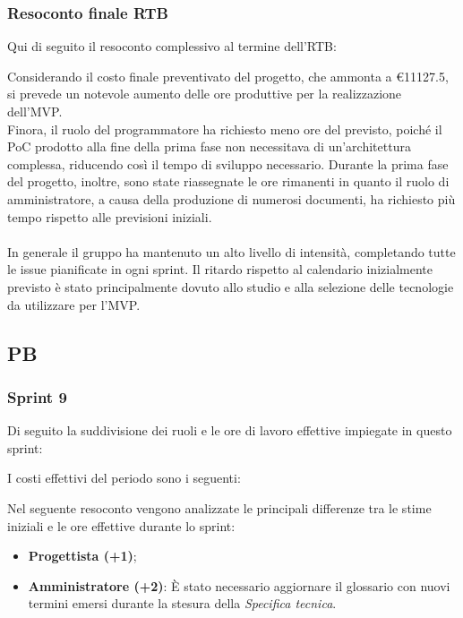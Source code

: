 \subsubsection{Resoconto finale RTB}
Qui di seguito il resoconto complessivo al termine dell'RTB:



Considerando il costo finale preventivato del progetto, che ammonta a \euro{11127.5}, si prevede un notevole aumento delle ore produttive per la realizzazione dell'MVP.\\
Finora, il ruolo del programmatore ha richiesto meno ore del previsto, poiché il PoC prodotto alla fine della prima fase non necessitava di un'architettura complessa, riducendo così il tempo di sviluppo necessario. 
Durante la prima fase del progetto, inoltre, sono state riassegnate le ore rimanenti in quanto il ruolo di amministratore, a causa della produzione di numerosi documenti, ha richiesto più tempo rispetto alle previsioni iniziali.\\\\
In generale il gruppo ha mantenuto un alto livello di intensità, completando tutte le issue pianificate in ogni sprint. 
Il ritardo rispetto al calendario inizialmente previsto è stato principalmente dovuto allo studio e alla selezione delle tecnologie da utilizzare per l'MVP.

\pagebreak

\subsection{PB}

\subsubsection{Sprint 9}
Di seguito la suddivisione dei ruoli e le ore di lavoro effettive impiegate in questo sprint:



I costi effettivi del periodo sono i seguenti:



Nel seguente resoconto vengono analizzate le principali differenze tra le stime iniziali e le ore effettive durante lo sprint:
\begin{itemize}
    \item \textbf{Progettista (+1)}; 
    \item \textbf{Amministratore (+2)}: È stato necessario aggiornare il glossario con nuovi termini emersi durante la stesura della \textit{Specifica tecnica}.
\end{itemize}

